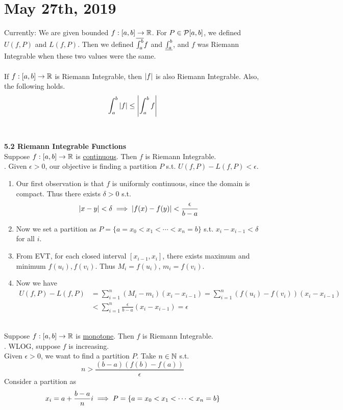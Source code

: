 \section*{May 27th, 2019}
Currently: We are given bounded $f: [a, b]\rightarrow\mathbb{R}$. For $P\in \mathcal{P}[a, b]$, we defined $U(f, P)$ and $L(f, P)$. Then we defined $\overline{\int_a^b} f$ and $\underline{\int_a^b}$, and $f$ was Riemann Integrable when these two values were the same.\\
\\
 If $f:[a, b]\rightarrow\mathbb{R}$ is Riemann Integrable, then $\left|f\right|$ is also Riemann Integrable. Also, the following holds.$$ \int_a^b \left|f\right| \leq\left|\int_a^b f\right| $$\\
\\
\textbf{5.2 Riemann Integrable Functions}\\
 Suppose $f:[a, b]\rightarrow\mathbb{R}$ is \underline{continuous}. Then $f$ is Riemann Integrable.\\
\pf. Given $\epsilon > 0$, our objective is finding a  partition $P$ s.t. $U(f, P) - L(f, P) < \epsilon$.
\begin{enumerate}
	\item Our first observation is that $f$ is uniformly continuous, since the domain is compact.
	Thus there exists $\delta >0$ s.t. $$\left|x-y\right| < \delta \implies \left|f(x) - f(y)\right| < \frac{\epsilon}{b-a}$$
	\item Now we set a partition as $P = \{a=x_0 < x_1  < \cdots < x_n =b\}$ s.t. $x_i-x_{i-1} < \delta$ for all $i$.
	\item From EVT, for each closed interval $[x_{i-1}, x_i]$, there exists maximum and minimum $f(u_i), f(v_i)$. Thus $M_i = f(u_i)$, $m_i = f(v_i)$.
	\item Now we have 
	$$\begin{aligned}
		U(f, P) - L(f, P) &= \sum_{i=1}^n (M_i-m_i)(x_i - x_{i-1}) = \sum_{i=1}^n (f(u_i) - f(v_i)) (x_i -x_{i-1}) \\&< \sum_{i=1}^n \frac{\epsilon}{b-a} (x_i - x_{i-1}) = \epsilon	
	\end{aligned}$$
\end{enumerate}
~\\
 Suppose $f:[a, b]\rightarrow\mathbb{R}$ is \underline{monotone}. Then $f$ is Riemann Integrable.\\
\pf. WLOG, suppose $f$ is increasing.\\
Given $\epsilon > 0$, we want to find a partition $P$. Take $n\in \mathbb{N}$ s.t. $$n > \frac{(b-a)(f(b)-f(a))}{\epsilon}$$
Consider a partition as $$x_i = a+ \frac{b-a}{n}i \implies P = \{a =x_0 < x_1 < \cdots < x_n = b \}$$
